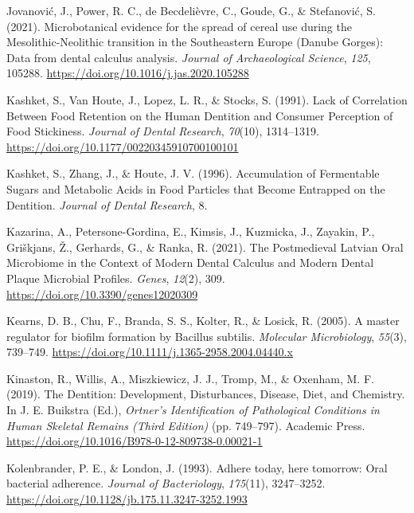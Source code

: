 \documentclass[
  letterpaper,
]{book}
\newlength{\cslhangindent}
\newlength{\cslentryspacingunit} %
\newenvironment{CSLReferences}[2] %
 {%
  \setlength{\parindent}{0pt}
  \ifodd #1
  \let\oldpar\par
  \def\par{\hangindent=\cslhangindent\oldpar}
  \fi
  \setlength{\parskip}{#2\cslentryspacingunit}
 }%
 {}
\begin{document}
\begin{CSLReferences}{1}{0}
\leavevmode{}%
Jovanović, J., Power, R. C., de Becdelièvre, C., Goude, G., \&
Stefanović, S. (2021). Microbotanical evidence for the spread of cereal
use during the {Mesolithic-Neolithic} transition in the {Southeastern
Europe} ({Danube Gorges}): {Data} from dental calculus analysis.
\emph{Journal of Archaeological Science}, \emph{125}, 105288.
\url{https://doi.org/10.1016/j.jas.2020.105288}

\leavevmode{}%
Kashket, S., Van Houte, J., Lopez, L. R., \& Stocks, S. (1991). Lack of
{Correlation Between Food Retention} on the {Human Dentition} and
{Consumer Perception} of {Food Stickiness}. \emph{Journal of Dental
Research}, \emph{70}(10), 1314--1319.
\url{https://doi.org/10.1177/00220345910700100101}

\leavevmode{}%
Kashket, S., Zhang, J., \& Houte, J. V. (1996). Accumulation of
{Fermentable Sugars} and {Metabolic Acids} in {Food Particles} that
{Become Entrapped} on the {Dentition}. \emph{Journal of Dental
Research}, 8.

\leavevmode{}%
Kazarina, A., Petersone-Gordina, E., Kimsis, J., Kuzmicka, J., Zayakin,
P., Griškjans, Ž., Gerhards, G., \& Ranka, R. (2021). The {Postmedieval
Latvian Oral Microbiome} in the {Context} of {Modern Dental Calculus}
and {Modern Dental Plaque Microbial Profiles}. \emph{Genes},
\emph{12}(2), 309. \url{https://doi.org/10.3390/genes12020309}

\leavevmode{}%
Kearns, D. B., Chu, F., Branda, S. S., Kolter, R., \& Losick, R. (2005).
A master regulator for biofilm formation by {Bacillus} subtilis.
\emph{Molecular Microbiology}, \emph{55}(3), 739--749.
\url{https://doi.org/10.1111/j.1365-2958.2004.04440.x}

\leavevmode{}%
Kinaston, R., Willis, A., Miszkiewicz, J. J., Tromp, M., \& Oxenham, M.
F. (2019). The {Dentition}: {Development}, {Disturbances}, {Disease},
{Diet}, and {Chemistry}. In J. E. Buikstra (Ed.), \emph{Ortner's
{Identification} of {Pathological Conditions} in {Human Skeletal
Remains} ({Third Edition})} (pp. 749--797). {Academic Press}.
\url{https://doi.org/10.1016/B978-0-12-809738-0.00021-1}

\leavevmode{}%
Kolenbrander, P. E., \& London, J. (1993). Adhere today, here tomorrow:
Oral bacterial adherence. \emph{Journal of Bacteriology},
\emph{175}(11), 3247--3252.
\url{https://doi.org/10.1128/jb.175.11.3247-3252.1993}


\end{CSLReferences}
\end{document}
